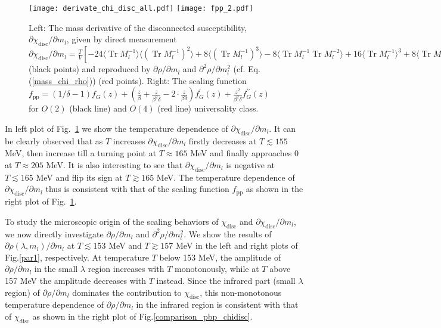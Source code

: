 \documentclass[a4paper,11pt]{article}
\numberwithin{equation}{section}
\begin{document}
\begin{figure}[htbp]
\texttt{[image: derivate\_chi\_disc\_all.pdf]}
\texttt{[image: fpp\_2.pdf]}
\caption{Left: The mass derivative of the disconnected susceptibility, $\partial \chi_{\mathrm{disc}}/\partial m_l$, given by direct measurement $\partial \chi_{\mathrm{disc}}/\partial m_l = \frac{T}{V} 
[-24 \langle\operatorname{Tr} M_{l}^{-1}\rangle \langle(\operatorname{Tr} M_{l}^{-1})^{2}\rangle
+ 8 \langle(\operatorname{Tr} M_{l}^{-1})^{3}\rangle
- 8 \langle \operatorname{Tr} M_{l}^{-1}\operatorname{Tr} M_{l}^{-2}\rangle
+ 16\langle \operatorname{Tr} M_{l}^{-1}\rangle^{3}
+ 8 \langle \operatorname{Tr} M_{l}^{-1}\rangle \langle \operatorname{Tr} M_{l}^{-2}\rangle]$ (black points) and reproduced by $\partial \rho/ \partial m_l$ and $\partial ^2\rho/ \partial m_l^2$ (cf. Eq.(\ref{mass_chi_rho})) (red points). Right: The scaling function $f_{\mathrm{pp}}=(1 / \delta-1) f_{G}(z)+\left(\frac{z}{\beta}+\frac{z}{\beta^{2} \delta}-2 \cdot \frac{z}{\beta \delta}\right) f_{G}^{\prime}(z)+\frac{z^{2}}{\beta^{2} \delta} f_{G}^{\prime \prime}(z)$ for $O(2)$ (black line) and $O(4)$ (red line) universality class.}
\label{mass_derivative_chi_disc}
\end{figure}

In left plot of Fig.~\ref{mass_derivative_chi_disc} we show the temperature dependence of $\partial \chi_{\mathrm{disc}}/\partial m_l$. It can be clearly observed that as $T$ increases $\partial \chi_{\mathrm{disc}}/\partial m_l$ firstly decreases at $T\lesssim 155$ MeV, then increase till a turning point at $T\approx 165$ MeV and finally approaches 0 at $T\approx 205$ MeV. It is also interesting to see that $\partial \chi_{\mathrm{disc}}/\partial m_l$ is negative at $T\lesssim 165$ MeV and flip its sign at $T\gtrsim 165$ MeV. The temperature dependence of  $\partial \chi_{\mathrm{disc}}/\partial m_l$ thus is consistent with that of the scaling function $f_{\mathrm{pp}}$ as shown in the right plot of Fig.~\ref{mass_derivative_chi_disc}.




To study the microscopic origin of the scaling behaviors of $\chi_{\mathrm{disc}}$ and $\partial \chi_{\mathrm{disc}}/\partial m_l$, we now directly investigate $\partial \rho/ \partial m_l$ and $\partial^2 \rho/ \partial m_l^2$. We show the results of $\partial \rho(\lambda, m_l)/\partial m_l$ at $T\lesssim153$ MeV and $T\gtrsim157$ MeV in the left and right plots of Fig.\ref{par1}, respectively.
At temperature $T$ below 153 MeV, the amplitude of $\partial \rho/\partial m_l$ in the small $\lambda$ region increases with $T$ monotonously, while at $T$ above 157 MeV the amplitude decreases with $T$ instead.
Since the infrared part (small $\lambda$ region) of $\partial \rho/\partial m_l$ dominates the contribution to $\chi_{\mathrm{disc}}$, this non-monotonous temperature dependence of $\partial \rho/\partial m_l$ in the infrared region is consistent with that of $\chi_{\mathrm{disc}}$ as shown in the right plot of Fig.\ref{comparison_pbp_chidisc}.
\end{document}
